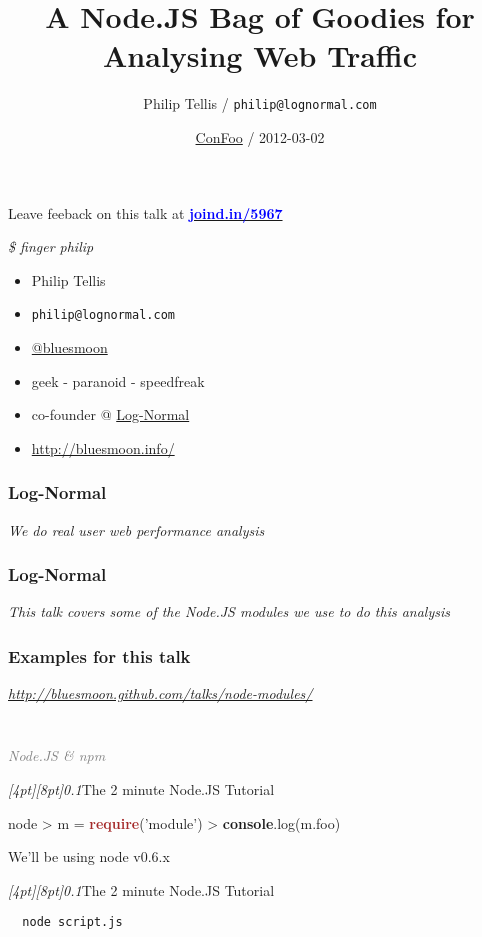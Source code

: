 \documentclass{beamer}
\author{Philip Tellis / \texttt{philip@lognormal.com}}
\title{A Node.JS Bag of Goodies for Analysing Web Traffic}
\date{\href{http://confoo.ca/}{ConFoo} / 2012-03-02}
\newcommand{\sn}[1]{\textrm{\textit{\Huge{\raisebox{-3pt}[4pt][8pt]{\textcolor{f2elblue}{#1}}}}}\hspace{4pt}}
\newcommand{\innersplash}[1]{
  \begin{center}
    \large \textrm{\textit{ #1 } }
  \end{center}
}
\newcommand{\splashslide}[2][{}]{
  \begin{frame}
  \frametitle{#1}
  \innersplash{#2}
  \end{frame}
}
\newcommand{\leadinslide}[2]{
  \splashslide{
     {\fontsize{150}{20}\selectfont{\raisebox{0pt}[90pt][0pt]{\textcolor{light-gray}{#1}}}} \\ \huge \textcolor{gray}{#2}
  }
}
\def\brown<#1>#2{\textcolor<#1>{brown}{\textbf<#1>{#2}}}
\def\green<#1>#2{\textcolor<#1>{dark-green}{\textbf<#1>{#2}}}
\def\blue<#1>#2{\textcolor<#1>{blue}{\textbf<#1>{#2}}}
\begin{document}
\begin{frame}
  \titlepage
\end{frame}


\begin{frame}
\begin{center}

  Leave feeback on this talk at \href{https://joind.in/5967}{\blue<1>{joind.in/5967}}
\end{center}
\end{frame}

\begin{frame}{\textit{\$ finger philip}}
  \begin{itemize}
  \item Philip Tellis
  \item \small{\texttt{philip@lognormal.com}}
  \item \href{http://twitter.com/bluesmoon}{@bluesmoon}
  \item geek - paranoid - speedfreak
  \item co-founder @ \href{http://www.lognormal.com/}{Log-Normal}
  \item \href{http://bluesmoon.info/}{http://bluesmoon.info/}
  \end{itemize}
\end{frame}

\splashslide[Log-Normal]{We do real user web performance analysis}

\splashslide[Log-Normal]{This talk covers some of the Node.JS modules we use to do this analysis}

\splashslide[Examples for this talk]{\href{http://bluesmoon.github.com/talks/node-modules/}{http://bluesmoon.github.com/talks/node-modules/}}

\leadinslide{--}{Node.JS \& npm}

\begin{frame}[fragile]{\sn{0.1}The 2 minute Node.JS Tutorial}
\begin{semiverbatim}
  node
  > m = \brown<1>{require}('module')
  > \green<1>{console}.log(m.foo)
\end{semiverbatim}
We'll be using node v0.6.x
\end{frame}

\begin{frame}[fragile]{\sn{0.1}The 2 minute Node.JS Tutorial}
\begin{verbatim}
  node script.js
\end{verbatim}
\end{frame}
\end{document}
